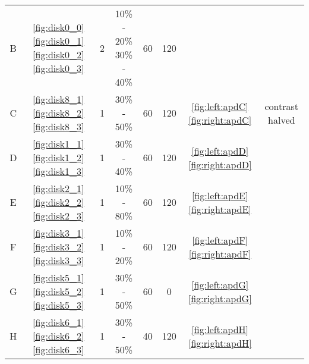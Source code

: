 \begin{table}
{\begin{tabular}{cccccccc}
    B         & \ref{fig:disk0_0} \ref{fig:disk0_1} \ref{fig:disk0_2} \ref{fig:disk0_3}  & 2 & \makecell[t]{10\% - 20\% \\ 
                                                                                           30\% - 40\%} & 60             & 120 \\
    C         & \ref{fig:disk8_1} \ref{fig:disk8_2} \ref{fig:disk8_3} & 1 & 30\% - 50\%                 & 60             & 120 & \autoref{fig:left:apdC} \autoref{fig:right:apdC} & contrast halved \\
    D         & \ref{fig:disk1_1} \ref{fig:disk1_2} \ref{fig:disk1_3} & 1 & 30\% - 40\%                 & 60             & 120 & \autoref{fig:left:apdD} \autoref{fig:right:apdD}\\
    E         & \ref{fig:disk2_1} \ref{fig:disk2_2} \ref{fig:disk2_3} & 1 & 10\% - 80\%                 & 60             & 120 & \autoref{fig:left:apdE} \autoref{fig:right:apdE}\\
    F         & \ref{fig:disk3_1} \ref{fig:disk3_2} \ref{fig:disk3_3} & 1 & 10\% - 20\%                 & 60             & 120  & \autoref{fig:left:apdF} \autoref{fig:right:apdF}\\
    G         & \ref{fig:disk5_1} \ref{fig:disk5_2} \ref{fig:disk5_3} & 1 & 30\% - 50\%                 & 60             & 0   & \autoref{fig:left:apdG} \autoref{fig:right:apdG}\\
    H         & \ref{fig:disk6_1} \ref{fig:disk6_2} \ref{fig:disk6_3} & 1 & 30\% - 50\%                 & 40             & 120 & \autoref{fig:left:apdH} \autoref{fig:right:apdH}\\
    \bottomrule
    \end{tabular}
}
    \label{tab:disks}
\end{table}


